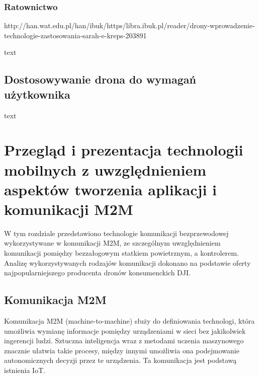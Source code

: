 \subsubsection{Ratownictwo}

\hspace{1cm} http://han.wat.edu.pl/han/ibuk/https/libra.ibuk.pl/reader/drony-wprowadzenie-technologie-zastosowania-sarah-e-kreps-203891

\hspace{1cm}text
\subsection{Dostosowywanie drona do wymagań użytkownika}
\hspace{1cm}text

\newpage 
\section{Przegląd i prezentacja technologii mobilnych z uwzględnieniem aspektów tworzenia aplikacji i komunikacji M2M}
\hspace{1cm}W tym rozdziale przedstawiono technologie komunikacji bezprzewodowej wykorzystywane w komunikacji M2M, ze szczególnym uwzględnieniem komunikacji pomiędzy bezzałogowym statkiem powietrznym, a kontrolerem. Analizę wykorzystywanych rodzajów komunikacji dokonano na podstawie oferty najpopularniejszego producenta dronów konsumenckich DJI.

\subsection{Komunikacja M2M}
\hspace{1cm}Komunikacja M2M (machine-to-machine) służy do definiowania technologi, która umożliwia wymianę informacje pomiędzy urządzeniami w sieci bez jakikolwiek ingerencji ludzi. Sztuczna inteligencja wraz z metodami uczenia maszynowego znacznie ułatwia takie procesy, między innymi umożliwia ona podejmowanie autonomicznych decyzji przez te urządzenia. Ta komunikacja jest podstawą istnienia IoT.\cite{m2m-web}

